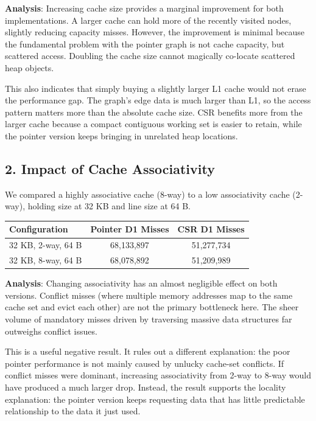 \documentclass[11pt]{article}
\begin{document}
\textbf{Analysis}: Increasing cache size provides a marginal improvement for both implementations. A larger cache can hold more of the recently visited nodes, slightly reducing capacity misses. However, the improvement is minimal because the fundamental problem with the pointer graph is not cache capacity, but scattered access. Doubling the cache size cannot magically co-locate scattered heap objects.

This also indicates that simply buying a slightly larger L1 cache would not erase the performance gap. The graph's edge data is much larger than L1, so the access pattern matters more than the absolute cache size. CSR benefits more from the larger cache because a compact contiguous working set is easier to retain, while the pointer version keeps bringing in unrelated heap locations.

\subsection{2. Impact of Cache Associativity}
We compared a highly associative cache (8-way) to a low associativity cache (2-way), holding size at 32 KB and line size at 64 B.

\begin{table}[H]
\centering
\begin{tabular}{@{}lcc@{}}
\toprule
\textbf{Configuration} & \textbf{Pointer D1 Misses} & \textbf{CSR D1 Misses} \\ \midrule
32 KB, 2-way, 64 B & 68,133,897 & 51,277,734 \\
32 KB, 8-way, 64 B & 68,078,892 & 51,209,989 \\ \bottomrule
\end{tabular}
\end{table}

\textbf{Analysis}: Changing associativity has an almost negligible effect on both versions. Conflict misses (where multiple memory addresses map to the same cache set and evict each other) are not the primary bottleneck here. The sheer volume of mandatory misses driven by traversing massive data structures far outweighs conflict issues.

This is a useful negative result. It rules out a different explanation: the poor pointer performance is not mainly caused by unlucky cache-set conflicts. If conflict misses were dominant, increasing associativity from 2-way to 8-way would have produced a much larger drop. Instead, the result supports the locality explanation: the pointer version keeps requesting data that has little predictable relationship to the data it just used.
\end{document}
